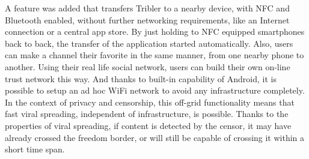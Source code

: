 A feature was added that transfers Tribler to a nearby device, with NFC and Bluetooth enabled, without further networking requirements, like an Internet connection or a central app store.
By just holding to NFC equipped smartphones back to back, the transfer of the application started automatically.
Also, users can make a channel their favorite in the same manner, from one nearby phone to another.
Using their real life social network, users can build their own on-line trust network this way.
And thanks to built-in capability of Android, it is possible to setup an ad hoc WiFi network to avoid any infrastructure completely.
In the context of privacy and censorship, this off-grid functionality means that fast viral spreading, independent of infrastructure, is possible.
Thanks to the properties of viral spreading, if content is detected by the censor, it may have already crossed the freedom border, or will still be capable of crossing it within a short time span.

